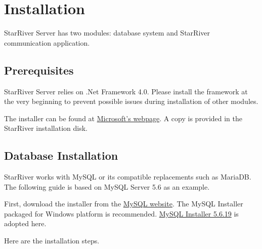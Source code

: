 \section{Installation}\label{installation}

StarRiver Server has two modules: database system and StarRiver
communication application.

\subsection{Prerequisites}\label{prerequisites}

StarRiver Server relies on .Net Framework 4.0. Please install the
framework at the very beginning to prevent possible issues during
installation of other modules.

The installer can be found at
\href{https://www.microsoft.com/en-US/download/details.aspx?id=17718}{Microsoft's
webpage}. A copy is provided in the StarRiver installation disk.

\subsection{Database Installation}\label{database-installation}

StarRiver works with MySQL or its compatible replacements such as
MariaDB. The following guide is based on MySQL Server 5.6 as an example.

First, download the installer from the
\href{http://dev.mysql.com/downloads/mysql/}{MySQL website}. The MySQL
Installer packaged for Windows platform is recommended.
\href{http://dev.mysql.com/downloads/windows/installer/5.6.html}{MySQL
Installer 5.6.19} is adopted here.

Here are the installation steps.

